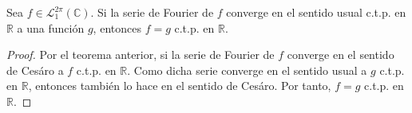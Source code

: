\documentclass[12pt]{report}
\theoremstyle{largebreak}
\begin{document}
    \begin{cor}
        Sea $f\in\mathcal{L}_1^{2\pi}(\mathbb{C})$. Si la serie de Fourier de $f$ converge en el sentido usual c.t.p. en $\mathbb{R}$ a una función $g$, entonces $f=g$ c.t.p. en $\mathbb{R}$.
    \end{cor}

    \begin{proof}
        Por el teorema anterior, si la serie de Fourier de $f$ converge en el sentido de Cesáro a $f$ c.t.p. en $\mathbb{R}$. Como dicha serie converge en el sentido usual a $g$ c.t.p. en $\mathbb{R}$, entonces también lo hace en el sentido de Cesáro. Por tanto, $f=g$ c.t.p. en $\mathbb{R}$.
    \end{proof}
    
\end{document}
